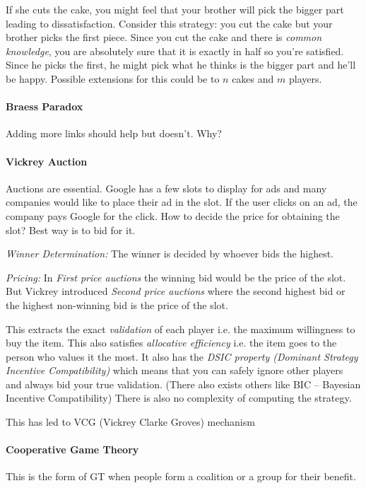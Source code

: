 If she cuts the cake, you might feel that your brother will pick the bigger part leading to dissatisfaction. Consider this strategy: you cut the cake but your brother picks the first piece. Since you cut the cake and there is \textit{common knowledge}, you are absolutely sure that it is exactly in half so you're satisfied. Since he picks the first, he might pick what he thinks is the bigger part and he'll be happy. Possible extensions for this could be to $n$ cakes and $m$ players.

\paragraph{Braess Paradox} Adding more links should help but doesn't. Why?

\paragraph{Vickrey Auction} Auctions are essential. Google has a few slots to display for ads and many companies would like to place their ad in the slot. If the user clicks on an ad, the company pays Google for the click. How to decide the price for obtaining the slot? Best way is to bid for it.  

\textit{Winner Determination:} The winner is decided by whoever bids the highest.

\textit{Pricing:} In \textit{First price auctions} the winning bid would be the price of the slot. But Vickrey introduced \textit{Second price auctions} where the second highest bid or the highest non-winning bid is the price of the slot.

This extracts the exact \textit{validation} of each player i.e. the maximum willingness to buy the item. This also satisfies \textit{allocative efficiency} i.e. the item goes to the person who values it the most. It also has the \textit{DSIC property (Dominant Strategy Incentive Compatibility)} which means that you can safely ignore other players and always bid your true validation. (There also exists others like BIC -- Bayesian Incentive Compatibility) There is also no complexity of computing the strategy.

This has led to VCG (Vickrey Clarke Groves) mechanism

\paragraph{Cooperative Game Theory} This is the form of GT when people form a coalition or a group for their benefit.

